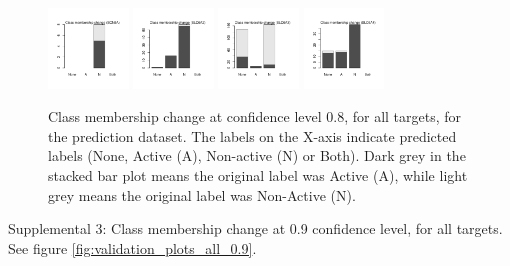 \documentclass[utf8]{frontiersSCNS} %
\begin{document}
\begin{figure}[h!]
\includegraphics[width=0.19\textwidth]{figures/validation_plots/scn5a_0p8_valplot.pdf}
\includegraphics[width=0.19\textwidth]{figures/validation_plots/slc6a2_0p8_valplot.pdf}
\includegraphics[width=0.19\textwidth]{figures/validation_plots/slc6a3_0p8_valplot.pdf}
\includegraphics[width=0.19\textwidth]{figures/validation_plots/slc6a4_0p8_valplot.pdf}
    \caption{Class membership change at confidence level 0.8, for all targets,
    for the prediction dataset.
    The labels on the X-axis indicate predicted labels (None, Active (A),
    Non-active (N) or Both). Dark grey in the stacked bar plot means the
    original label was Active (A), while light grey means the original label
    was Non-Active (N).
    }
    \label{fig:validation_plots_all_0.8}
\end{figure}

Supplemental 3: Class membership change at 0.9 confidence level, for all
targets. See figure \ref{fig:validation_plots_all_0.9}.
\end{document}
